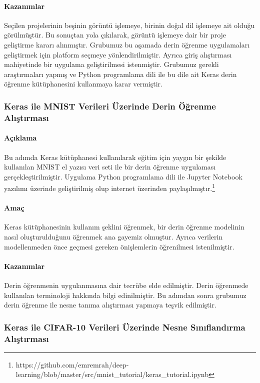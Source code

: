 \documentclass[12pt,a4paper]{article}
\begin{document}
    \paragraph{Kazanımlar}
    Seçilen projelerinin beşinin görüntü işlemeye, birinin doğal dil işlemeye ait olduğu görülmüştür. Bu sonuçtan yola çıkılarak, görüntü işlemeye dair bir proje geliştirme kararı alınmıştır.
    Grubumuz bu aşamada derin öğrenme uygulamaları geliştirmek için platform seçmeye yönlendirilmiştir. Ayrıca giriş alıştırması mahiyetinde bir uygulama geliştirilmesi istenmiştir.
    Grubumuz gerekli araştırmaları yapmış ve Python programlama dili ile bu dile ait Keras derin öğrenme kütüphanesini kullanmaya karar vermiştir.

    \subsubsection{Keras ile MNIST Verileri Üzerinde Derin Öğrenme Alıştırması}
    \paragraph{Açıklama}
    Bu adımda Keras kütüphanesi kullanılarak eğitim için yaygın bir şekilde kullanılan MNIST el yazısı veri seti ile bir derin öğrenme uygulaması gerçekleştirilmiştir. 
    Uygulama Python programlama dili ile Jupyter Notebook yazılımı üzerinde geliştirilmiş olup internet üzerinden paylaşılmıştır.\footnote{https://github.com/emremrah/deep-learning/blob/master/src/mnist\_tutorial/keras\_tutorial.ipynb}
    \paragraph{Amaç}
    Keras kütüphanesinin kullanım şeklini öğrenmek, bir derin öğrenme modelinin nasıl oluşturulduğunu öğrenmek ana gayemiz olmuştur. Ayrıca verilerin modellenmeden önce geçmesi gereken önişlemlerin
    öğrenilmesi istenilmiştir.

    \paragraph{Kazanımlar}
    Derin öğrenmenin uygulanmasına dair tecrübe elde edilmiştir. Derin öğrenmede kullanılan terminoloji hakkında bilgi edinilmiştir. Bu adımdan sonra grubumuz derin öğrenme ile nesne tanıma alıştırması
    yapmaya teşvik edilmiştir.

    \subsubsection{Keras ile CIFAR-10 Verileri Üzerinde Nesne Sınıflandırma Alıştırması}
\end{document}
